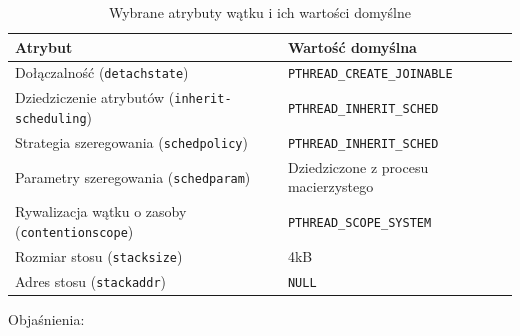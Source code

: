 \begin{table}[h!]
\centering
\caption{Wybrane atrybuty wątku i ich wartości domyślne}
\setlength{\arrayrulewidth}{1pt}
\setlength{\tabcolsep}{6pt}
\renewcommand{\arraystretch}{1.2}
\begin{tabular}{ |p{}|p{}| }
\hline \rowcolor{gray}
\textbf{Atrybut} & \textbf{Wartość domyślna} \\ \hline
Dołączalność (\mbox{\lstinline[style=MyCStyle]{detachstate}}) & \mbox{\lstinline[style=MyCStyle]{PTHREAD_CREATE_JOINABLE}} \\ \hline
Dziedziczenie atrybutów (\mbox{\lstinline[style=MyCStyle]{inherit-scheduling}}) & \mbox{\lstinline[style=MyCStyle]{PTHREAD_INHERIT_SCHED}} \\ \hline
Strategia szeregowania (\mbox{\lstinline[style=MyCStyle]{schedpolicy}}) & \mbox{\lstinline[style=MyCStyle]{PTHREAD_INHERIT_SCHED}} \\ \hline
Parametry szeregowania (\mbox{\lstinline[style=MyCStyle]{schedparam}}) & Dziedziczone z procesu macierzystego \\ \hline
Rywalizacja wątku o zasoby (\mbox{\lstinline[style=MyCStyle]{contentionscope}}) & \mbox{\lstinline[style=MyCStyle]{PTHREAD_SCOPE_SYSTEM}} \\ \hline
Rozmiar stosu (\mbox{\lstinline[style=MyCStyle]{stacksize}}) & 4kB \\ \hline
Adres stosu (\mbox{\lstinline[style=MyCStyle]{stackaddr}}) & \mbox{\lstinline[style=MyCStyle]{NULL}} \\ \hline
\end{tabular}
\label{tab:atrybuty1}
\end{table}


Objaśnienia:

